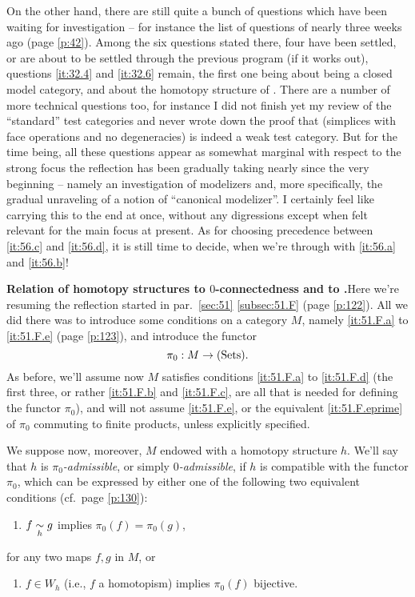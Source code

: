 On the other hand, there are still quite a bunch of questions which
have been waiting for investigation -- for instance the list of
questions of nearly three weeks ago (page \ref{p:42}). Among the six
questions stated there, four have been settled, or are about to be
settled through the previous program (if it works out), questions
\ref{it:32.4} and \ref{it:32.6} remain, the first one being about
\Ahat{} being a closed model category, and about the homotopy
structure of \Cat. There are a number of more technical questions too,
for instance I did not finish yet my review of the ``standard'' test
categories and never wrote down the proof that \Simplexf{} (simplices
with face operations and no degeneracies) is indeed a weak test
category. But for the time being, all these questions appear as
somewhat marginal with respect to the strong focus the reflection has
been gradually taking nearly since the very beginning --
namely an investigation of modelizers and, more specifically, the
gradual unraveling of a notion of ``canonical modelizer''. I certainly
feel like carrying this to the end at once, without any digressions
except when felt relevant for the main focus at present. As for
choosing precedence between \ref{it:56.c} and \ref{it:56.d}, it is
still time to decide, when we're through with \ref{it:56.a} and \ref{it:56.b}!

\label{sec:57}%
\textbf{Relation of homotopy structures to $0$-connectedness and to
  \piz.}\enspace Here we're resuming the reflection started in par.\
\ref{sec:51} \ref{subsec:51.F} (page \ref{p:122}). All we did there
was to introduce some conditions on a category $M$, namely
\ref{it:51.F.a} to \ref{it:51.F.e} (page \ref{p:123}), and introduce
the functor
\[\pi_0 : M \to {\ensuremath{(\mathrm{Sets})}}.\]
As before, we'll assume now $M$ satisfies conditions \ref{it:51.F.a}
to \ref{it:51.F.d} (the first three, or rather \ref{it:51.F.b} and
\ref{it:51.F.c}, are all that is needed for defining the functor
$\pi_0$), and will not assume \ref{it:51.F.e}, or the equivalent
\ref{it:51.F.eprime} of $\pi_0$ commuting to finite products, unless
explicitly specified.

We suppose now, moreover, $M$ endowed with a homotopy structure
$h$. We'll say that $h$ is \emph{$\pi_0$-admissible}, or simply
\emph{$0$-admissible}, if $h$ is compatible with the functor $\pi_0$,
which can be expressed by either one of the following two equivalent
conditions (cf.\ page \ref{p:130}):
\begin{enumerate}[label=(\roman*)]
\item\label{it:57.i}
  $f\mathrel{\underset{h}{\sim}} g$ implies $\pi_0(f)=\pi_0(g)$,
\end{enumerate}
for any two maps $f,g$ in $M$, or
\begin{enumerate}[label=(\roman*),resume]
\item\label{it:57.ii}
  $f\in W_h$ (i.e., $f$ a homotopism) implies $\pi_0(f)$ bijective.
\end{enumerate}

